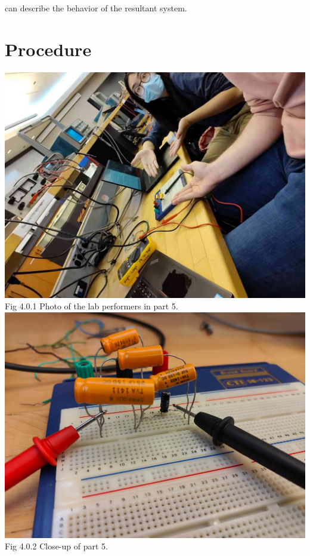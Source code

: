 \documentclass[titlepage]{article}
\begin{document}
can describe the behavior of the resultant system.
	

	\section{Procedure}
\begin{center}
	\vspace{1cm}
	\includegraphics[scale=0.2]{selfies/selfie-part5.jpg}\\
	Fig 4.0.1 Photo of the lab performers in part 5.\\
	\vspace{1cm}
	\includegraphics[scale=0.14]{selfies/part-5.png}\\
	Fig 4.0.2 Close-up of part 5.\\

\end{center}
\end{document}
